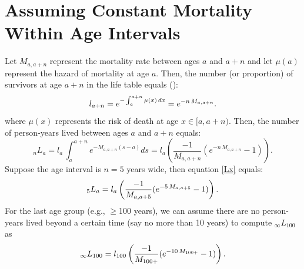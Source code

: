 \documentclass[11pt,letterpaper]{article}
\theoremstyle{plain}
\theoremstyle{remark}
\numberwithin{equation}{section}
\begin{document}
\section{Assuming Constant Mortality Within Age Intervals}
Let $M_{a,a+n}$ represent the mortality rate between ages $a$ and
$a+n$ and let $\mu(a)$ represent the hazard of mortality at age
$a$. Then, the number (or proportion) of survivors at age $a+n$ in the
life table equals (\cite{PreHeuGui00}):
\begin{equation}
l_{a+n}=e^{-\int_a^{a+n}\mu(x)\,dx}=e^{-n\,M_{a,a+n}}.\notag
\end{equation}
where $\mu(x)$ represents the risk of death at age $x\in[a,a+n)$.
Then, the number of person-years lived between ages $a$ and $a+n$ equals:
\begin{equation}
_nL_{a}=l_a\,\int_a^{a+n} e^{-M_{a,a+n}(s-a)} ds=l_a \left(\frac{-1}{M_{a,a+n}}(e^{-n\,M_{a,a+n}}-1) \right).
\label{Lx}
\end{equation}
Suppose the age interval is $n=5$ years wide, then equation \eqref{Lx}
equals:
\begin{equation}
_5L_{a}=l_a \left(\frac{-1}{M_{a,a+5}}(e^{-5\,M_{a,a+5}}-1) \right).\notag
\end{equation}
For the last age group (e.g., $\geq$100 years), we can assume there
are no person-years lived beyond a certain time (say no more than 10
years) to compute $_{\infty}L_{100}$ as
\begin{equation}
_{\infty}L_{100}=l_{100} \left(\frac{-1}{M_{100+}}(e^{-10\,M_{100+}}-1) \right).\notag
\end{equation}


\newpage
\end{document}

